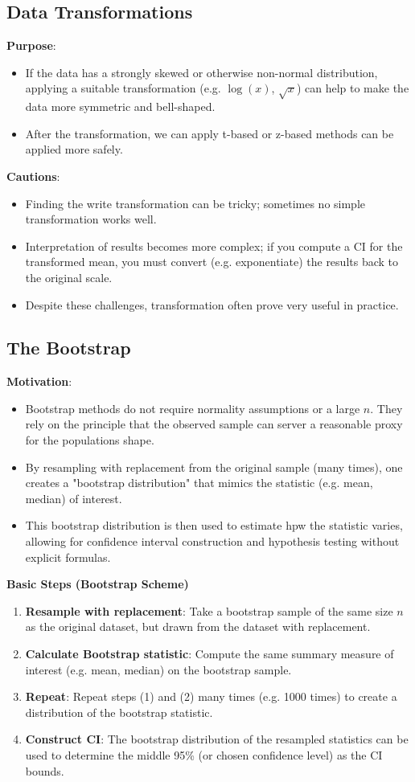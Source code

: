 \documentclass[9pt]{extarticle}
\begin{document}
\subsection{Data Transformations}
\textbf{Purpose}:
\begin{itemize}
    \item If the data has a strongly skewed or otherwise non-normal distribution, applying a suitable transformation (e.g. $\log(x)$, $\sqrt{x}$) can help to make the data more symmetric and bell-shaped.
    \item After the transformation, we can apply t-based or z-based methods can be applied more safely.
\end{itemize}
\textbf{Cautions}:
\begin{itemize}
    \item Finding the write transformation can be tricky; sometimes no simple transformation works well.
    \item Interpretation of results becomes more complex; if you compute a CI for the transformed mean, you must convert (e.g. exponentiate) the results back to the original scale.
    \item Despite these challenges, transformation often prove very useful in practice.
\end{itemize} 

\subsection{The Bootstrap}
\textbf{Motivation}:
\begin{itemize}
    \item Bootstrap methods do not require normality assumptions or a large $n$. They rely on the principle that the observed sample can server a reasonable proxy for the populations shape. 
    \item By resampling with replacement from the original sample (many times), one creates a "bootstrap distribution" that mimics the statistic (e.g. mean, median) of interest.
    \item This bootstrap distribution is then used to estimate hpw the statistic varies, allowing for confidence interval construction and hypothesis testing without explicit formulas.
\end{itemize}
\textbf{Basic Steps (Bootstrap Scheme)}
\begin{enumerate}
    \item \textbf{Resample with replacement}: Take a bootstrap sample of the same size $n$ as the original dataset, but drawn from the dataset with replacement.
    \item \textbf{Calculate Bootstrap statistic}: Compute the same summary measure of interest (e.g. mean, median) on the bootstrap sample.
    \item \textbf{Repeat}: Repeat steps (1) and (2) many times (e.g. 1000 times) to create a distribution of the bootstrap statistic.
    \item \textbf{Construct CI}: The bootstrap distribution of the resampled statistics can be used to determine the middle 95\% (or chosen confidence level) as the CI bounds.
\end{enumerate}
\end{document}
